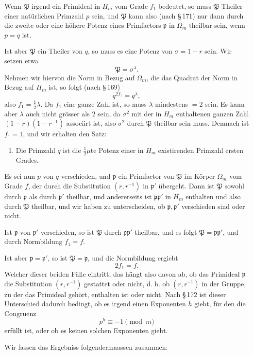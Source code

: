\documentclass[11pt]{article}
\newcommand{\frp}{\mathfrak p}
\newcommand{\frP}{\mathfrak P}
\begin{document}
Wenn $\frP$ irgend ein Primideal in $H_m$ vom Grade $f_1$ bedeutet, so muss $\frP$ Theiler einer natürlichen Primzahl $p$ sein, und $\frP$ kann also (nach \S\,171) nur dann durch die zweite oder eine höhere Potenz eines Primfactors $\frp$ in $\Omega_m$ theilbar sein, wenn $p=q$ ist.

Ist aber $\frP$ ein Theiler von $q$, so muss es eine Potenz von $\sigma=1-r$ sein. Wir setzen etwa
\[
\frP=\sigma^\lambda.
\]
Nehmen wir hiervon die Norm in Bezug auf $\Omega_m$, die das Quadrat der Norm in Bezug auf $H_m$ ist, so folgt (nach \S\,169)
\[
q^{2f_1}=q^\lambda,
\]
also $f_1=\frac12\lambda$. Da $f_1$ eine ganze Zahl ist, so muss $\lambda$ mindestens $=2$ sein. Es kann aber $\lambda$ auch nicht grösser als $2$ sein, da $\sigma^2$ mit der in $H_m$ enthaltenen ganzen Zahl $(1-r)(1-r^{-1})$ associirt ist, also $\sigma^2$ durch $\frP$ theilbar sein muss. Demnach ist $f_1=1$, und wir erhalten den Satz:

\begin{enumerate}[label=\arabic*.,leftmargin=2.2em]
\item Die Primzahl $q$ ist die $\frac12\mu$te Potenz einer in $H_m$ existirenden Primzahl ersten Grades.
\end{enumerate}

Es sei nun $p$ von $q$ verschieden, und $\frp$ ein Primfactor von $\frP$ im Körper $\Omega_m$ vom Grade $f$, der durch die Substitution $(r,r^{-1})$ in $\frp'$ übergeht. Dann ist $\frP$ sowohl durch $\frp$ als durch $\frp'$ theilbar, und andererseits ist $\frp\frp'$ in $H_m$ enthalten und also durch $\frP$ theilbar, und wir haben zu unterscheiden, ob $\frp,\frp'$ verschieden sind oder nicht.

Ist $\frp$ von $\frp'$ verschieden, so ist $\frP$ durch $\frp\frp'$ theilbar, und es folgt $\frP=\frp\frp'$, und durch Normbildung $f_1=f$.

Ist aber $\frp=\frp'$, so ist $\frP=\frp$, und die Normbildung ergiebt
\[
2f_1=f.
\]
Welcher dieser beiden Fälle eintritt, das hängt also davon ab, ob das Primideal $\frp$ die Substitution $(r,r^{-1})$ gestattet oder nicht, d. h. ob $(r,r^{-1})$ in der Gruppe, zu der das Primideal gehört, enthalten ist oder nicht. Nach \S\,172 ist dieser Unterschied dadurch bedingt, ob es irgend einen Exponenten $h$ giebt, für den die Congruenz
\[
p^h\equiv -1\pmod m
\]
erfüllt ist, oder ob es keinen solchen Exponenten giebt.

Wir fassen das Ergebniss folgendermaassen zusammen:
\end{document}
